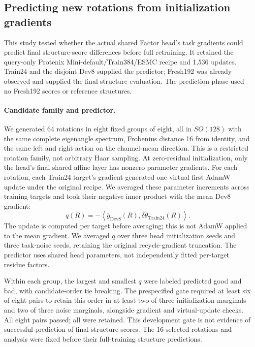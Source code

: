 \subsection{Predicting new rotations from initialization gradients}
\label{app:rotation_prediction}

This study tested whether the actual shared Factor head's task gradients
could predict final structure-score differences before full retraining.
It retained the query-only Protenix Mini-default/Train384/ESMC recipe and
1,536 updates. Train24 and the disjoint Dev8 supplied the predictor;
Fresh192 was already observed and supplied the final structure evaluation.
The prediction phase used no Fresh192 scores or reference structures.

\paragraph{Candidate family and predictor.}
We generated 64 rotations in eight fixed groups of eight, all in
$SO(128)$ with the same complete eigenangle spectrum, Frobenius distance
16 from identity, and the same left and right action on the channel-mean
direction. This is a restricted rotation family, not arbitrary Haar sampling.
At zero-residual initialization, only the head's final shared affine layer
has nonzero parameter gradients. For each rotation, each Train24 target's
gradient generated one virtual first AdamW update under the original recipe.
We averaged these parameter increments across training targets and took
their negative inner product with the mean Dev8 gradient:
\[
q(R)=-\left\langle\overline{g}_{\mathrm{Dev8}}(R),
                    \overline{\delta\theta}_{\mathrm{Train24}}(R)\right\rangle.
\]
The update is computed per target before averaging; this is not AdamW
applied to the mean gradient. We averaged $q$ over three head initialization
seeds and three task-noise seeds, retaining the original recycle-gradient
truncation. The predictor uses shared head parameters, not independently
fitted per-target residue factors.

Within each group, the largest and smallest $q$ were labeled predicted
good and bad, with candidate-order tie breaking. The prespecified gate
required at least six of eight pairs to retain this order in at least
two of three initialization marginals and two of three noise marginals,
alongside gradient and virtual-update checks. All eight pairs passed;
all were retained. This development gate is not evidence of successful
prediction of final structure scores. The 16 selected rotations and
analysis were fixed before their full-training structure predictions.

